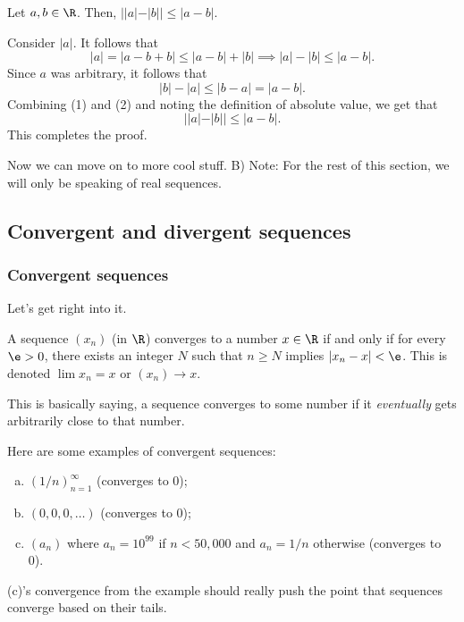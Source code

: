 \documentclass[class=article, crop=false]{standalone}
\begin{document}
\begin{thm}
    Let $a,b \in \R$. Then, $||a|-|b|| \leq |a-b|$.
\end{thm}
\begin{pf}
    Consider $|a|$. It follows that
        \[
            |a| = |a-b+b| \leq |a-b| + |b| \implies |a|-|b| \leq |a-b|. \tag{1}
        \]
    Since $a$ was arbitrary, it follows that
        \[
            |b|-|a| \leq |b-a| = |a-b|. \tag{2}
        \]
    Combining (1) and (2) and noting the definition of absolute value, we get that
        \[
            ||a|-|b|| \leq |a-b|.
        \]
    This completes the proof.
\end{pf}

Now we can move on to more cool stuff. B) Note: For the rest of this section, we will only be speaking of real sequences.

\subsection{Convergent and divergent sequences}

\subsubsection*{Convergent sequences}

Let's get right into it.
\begin{defn}[Convergence]{\label{defn:convergence in R}}
    A sequence $(x_n)$ (in $\R$) converges to a number $x \in \R$ if and only if for every $\e > 0$, there exists an integer $N$ such that $n \geq N$ implies $|x_n-x| < \e$. This is denoted $\lim x_n = x$ or $(x_n) \to x$.
\end{defn}
\begin{rem}
    This is basically saying, a sequence converges to some number if it \textit{eventually} gets arbitrarily close to that number.
\end{rem}

Here are some examples of convergent sequences:
\begin{ex}
    \begin{enumerate}[(a)]
        \item $(1/n)_{n=1}^\infty$ (converges to 0);
        \item $(0,0,0,\ldots)$ (converges to 0);
        \item $(a_n)$ where $a_n = 10^{99}$ if $n < 50,000$ and $a_n = 1/n$ otherwise (converges to 0).
    \end{enumerate}
\end{ex}
\begin{rem}
    (c)'s convergence from the example should really push the point that sequences converge based on their tails.
\end{rem}
\end{document}

